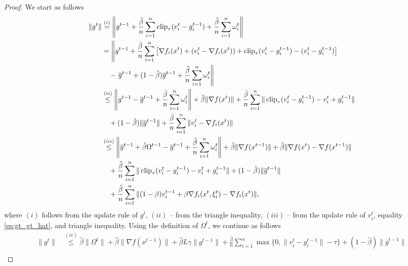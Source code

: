 \documentclass[a4paper,11pt]{article}
\begin{document}
\begin{proof}
    We start as follows
    \begin{align*}
        \|g^t\| &\overset{(i)}{=} \left\|g^{t-1} 
        + \frac{\hat{\beta}}{n}\sum_{i=1}^n\operatorname{clip}_\tau(v_i^t-g_i^{t-1}) 
        + \frac{\hat{\beta}}{n}\sum_{i=1}^n\omega^t_i\right\|\\
        &= \left\|
        g^{t-1}
        + \frac{\hat{\beta}}{n}\sum_{i=1}^n \left[\nabla f_i(x^{t}) + (v_i^t-\nabla f_i(x^t)) + \operatorname{clip}_\tau(v_i^t-g_i^{t-1}) - (v_i^t-g_i^{t-1})\right]\right.\\
        &\quad -\left.  
        \overline{g}^{t-1} + (1-\hat{\beta})\overline{g}^{t-1}
        + \frac{\hat{\beta}}{n}\sum_{i=1}^n\omega^t_i\right\|\\
        &\overset{(ii)}{\le} \left\|g^{t-1} - \overline{g}^{t-1} + \frac{\hat{\beta}}{n}\sum_{i=1}^n \omega_i^t\right\|
        + \hat{\beta}\|\nabla f(x^t)\|
        + \frac{\hat{\beta}}{n}\sum_{i=1}^n\|\operatorname{clip}_{\tau}(v_i^t - g_i^{t-1}) - v_i^t + g_i^{t-1}\|\\
        &\quad 
        + (1-\hat{\beta})\|\overline{g}^{t-1}\|
        + \frac{\hat{\beta}}{n}\sum_{i=1}^n\|v_i^t- \nabla f_i(x^{t})\|\\
        &\overset{(iii)}{\le} \left\|\overline{g}^{t-1} + \hat{\beta}\Omega^{t-1} - \overline{g}^{t-1} + \frac{\hat{\beta}}{n}\sum_{i=1}^n \omega_i^t\right\|
        + \hat{\beta}\|\nabla f(x^{t-1})\|
        + \hat{\beta}\|\nabla f(x^t) - \nabla f(x^{t-1})\|\\
        &\quad 
        + \frac{\hat{\beta}}{n}\sum_{i=1}^n\|\operatorname{clip}_{\tau}(v_i^t - g_i^{t-1}) - v_i^t + g_i^{t-1}\|
        + (1-\hat{\beta})\|\overline{g}^{t-1}\|\\
        &\quad + \frac{\hat{\beta}}{n}\sum_{i=1}^n\|(1-\beta)v_i^{t-1} +\beta\nabla f_i(x^t,\xi^t_i) - \nabla f_i(x^{t})\|,
    \end{align*}
    where $(i)$ follows from the update rule of $g^t$, $(ii)$ -- from the triangle inequality, $(iii)$ -- from the update rule of $v_i^t$, equality \eqref{eq:gt_gt_hat}, and triangle inequality. Using the definition of $\Omega^t$, we continue as follows 
    \begin{align*}
        \|g^t\| &\overset{(iv)}{\le} \hat{\beta}\|\Omega^t\|
        + \hat{\beta}\|\nabla f(x^{t-1})\| 
        + \hat{\beta}L\gamma\|g^{t-1}\|
        + \frac{\hat{\beta}}{n}\sum_{i=1}^n\max\{0, \|v_i^{t} - g_i^{t-1}\|-\tau\}
        + (1-\hat{\beta})\|\overline{g}^{t-1}\|\\
        &\quad

\end{align*}
\end{proof}
\end{document}
